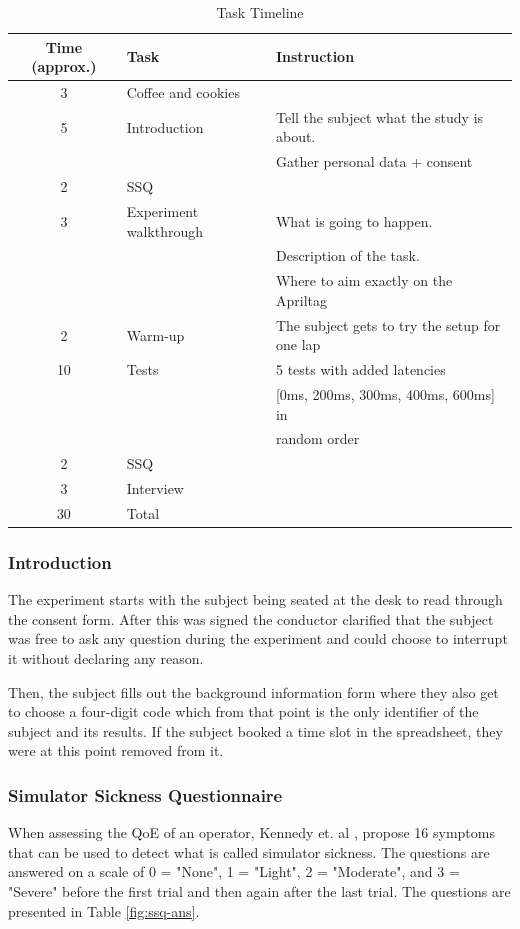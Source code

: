 \documentclass[nofilelist]{cslthse-msc}
\begin{document}
\begin{table}[ht]
   \centering
   \caption{Task Timeline}
   \label{tab:task-timeline}
   \begin{tabular}{|c|l|l|}
   \hline
   \textbf{Time (approx.)} & \textbf{Task} & \textbf{Instruction} \\ \hline
   3 & Coffee and cookies & \\ \hline
   5 & Introduction & Tell the subject what the study is about. \\
   & & Gather personal data + consent \\ \hline
   2 & SSQ & \\ \hline
   3 & Experiment walkthrough & What is going to happen. \\
   & & Description of the task. \\
   & & Where to aim exactly on the Apriltag \\ \hline
   2 & Warm-up & The subject gets to try the setup for one lap \\ \hline
   10 & Tests & 5 tests with added latencies \\  
   & & [0ms, 200ms, 300ms, 400ms, 600ms] in \\
   & & random order \\ \hline
   2 & SSQ & \\ \hline
   3 & Interview & \\ \hline
   30 & Total & \\ \hline
   \end{tabular}
\end{table}

\subsubsection{Introduction}
The experiment starts with the subject being seated at the desk to read through the consent form. After this was signed the conductor clarified that the subject was free to ask any question during the experiment and could choose to interrupt it without declaring any reason. 

Then, the subject fills out the background information form where they also get to choose a four-digit code which from that point is the only identifier of the subject and its results. If the subject booked a time slot in the spreadsheet, they were at this point removed from it.

\subsubsection{Simulator Sickness Questionnaire}
When assessing the QoE of an operator, Kennedy et. al \cite{ssq}, propose 16 symptoms that can be used to detect what is called simulator sickness. The questions are answered on a scale of 0 = "None", 1 = "Light", 2 = "Moderate", and 3 = "Severe" before the first trial and then again after the last trial. The questions are presented in Table \ref{fig:ssq-ans}.
\end{document}
